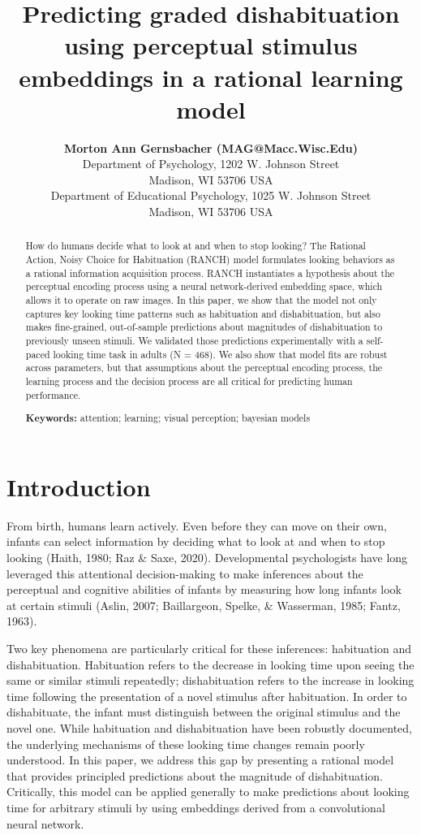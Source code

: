 \documentclass[10pt, letterpaper]{article}
\title{Predicting graded dishabituation using perceptual stimulus
embeddings in a rational learning model}
\author{{\large \bf Morton Ann Gernsbacher (MAG@Macc.Wisc.Edu)} \\ Department of Psychology, 1202 W. Johnson Street \\ Madison, WI 53706 USA \AND {\large \bf Sharon J.~Derry (SDJ@Macc.Wisc.Edu)} \\ Department of Educational Psychology, 1025 W. Johnson Street \\ Madison, WI 53706 USA}
\begin{document}
\maketitle

\begin{abstract}
How do humans decide what to look at and when to stop looking? The
Rational Action, Noisy Choice for Habituation (RANCH) model formulates
looking behaviors as a rational information acquisition process. RANCH
instantiates a hypothesis about the perceptual encoding process using a
neural network-derived embedding space, which allows it to operate on
raw images. In this paper, we show that the model not only captures key
looking time patterns such as habituation and dishabituation, but also
makes fine-grained, out-of-sample predictions about magnitudes of
dishabituation to previously unseen stimuli. We validated those
predictions experimentally with a self-paced looking time task in adults
(N = 468). We also show that model fits are robust across parameters,
but that assumptions about the perceptual encoding process, the learning
process and the decision process are all critical for predicting human
performance.

\textbf{Keywords:}
attention; learning; visual perception; bayesian models
\end{abstract}

\hypertarget{introduction}{%
\section{Introduction}\label{introduction}}

From birth, humans learn actively. Even before they can move on their
own, infants can select information by deciding what to look at and when
to stop looking (Haith, 1980; Raz \& Saxe, 2020). Developmental
psychologists have long leveraged this attentional decision-making to
make inferences about the perceptual and cognitive abilities of infants
by measuring how long infants look at certain stimuli (Aslin, 2007;
Baillargeon, Spelke, \& Wasserman, 1985; Fantz, 1963).

Two key phenomena are particularly critical for these inferences:
habituation and dishabituation. Habituation refers to the decrease in
looking time upon seeing the same or similar stimuli repeatedly;
dishabituation refers to the increase in looking time following the
presentation of a novel stimulus after habituation. In order to
dishabituate, the infant must distinguish between the original stimulus
and the novel one. While habituation and dishabituation have been
robustly documented, the underlying mechanisms of these looking time
changes remain poorly understood. In this paper, we address this gap by
presenting a rational model that provides principled predictions about
the magnitude of dishabituation. Critically, this model can be applied
generally to make predictions about looking time for arbitrary stimuli
by using embeddings derived from a convolutional neural network.
\end{document}
